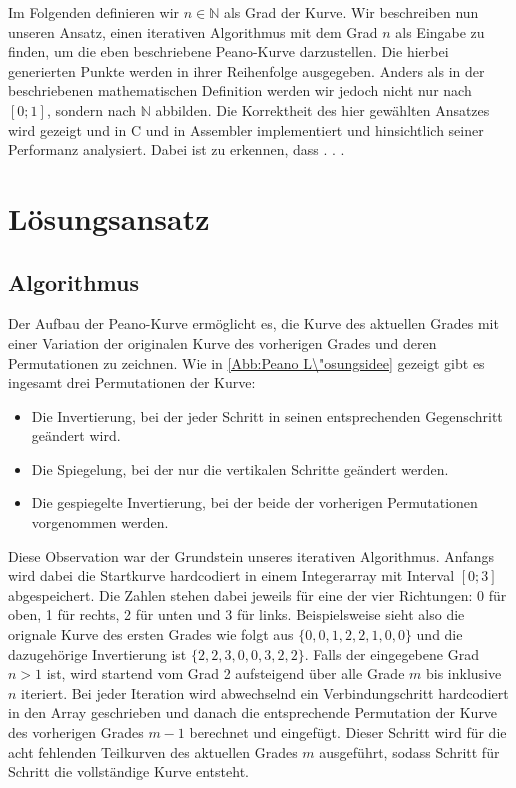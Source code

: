 \documentclass[course=asp]{aspdoc}
\begin{document}
Im Folgenden definieren wir $n \in \mathbb{N}$ als Grad der Kurve.
Wir beschreiben nun unseren Ansatz, einen iterativen Algorithmus mit dem Grad $n$ als Eingabe zu finden, um die eben beschriebene Peano-Kurve darzustellen. Die hierbei generierten Punkte werden in ihrer Reihenfolge ausgegeben. Anders als in der beschriebenen mathematischen Definition werden wir jedoch nicht nur nach $[0;1]$, sondern nach $\mathbb{N}$ abbilden.
Die Korrektheit des hier gew\"ahlten Ansatzes wird gezeigt und in C und in Assembler implementiert und hinsichtlich seiner Performanz analysiert. Dabei ist zu erkennen, dass . . .

\newpage

\section{L\"osungsansatz} \label{L\"osungsansatz}

\subsection{Algorithmus} \label{Algorithmus}

Der Aufbau der Peano-Kurve erm\"oglicht es, die Kurve des aktuellen Grades mit einer Variation der originalen Kurve des vorherigen Grades und deren Permutationen zu zeichnen. Wie in \ref{Abb:Peano L\"osungsidee} gezeigt gibt es ingesamt drei Permutationen der Kurve:

\begin{itemize}
    \item Die Invertierung, bei der jeder Schritt in seinen entsprechenden Gegenschritt ge\"andert wird.
    \item Die Spiegelung, bei der nur die vertikalen Schritte ge\"andert werden.
    \item Die gespiegelte Invertierung, bei der beide der vorherigen Permutationen vorgenommen werden.
\end{itemize}

Diese Observation war der Grundstein unseres iterativen Algorithmus. Anfangs wird dabei die Startkurve hardcodiert in einem Integerarray mit Interval $[0;3]$ abgespeichert. Die Zahlen stehen dabei jeweils f\"ur eine der vier Richtungen: 0 f\"ur oben, 1 f\"ur rechts, 2 f\"ur unten und 3 f\"ur links. Beispielsweise sieht also die orignale Kurve des ersten Grades wie folgt aus $\{0, 0, 1, 2, 2, 1, 0, 0\}$ und die dazugeh\"orige Invertierung ist $\{2, 2, 3, 0, 0, 3, 2, 2\}$. 
Falls der eingegebene Grad $n > 1$ ist, wird startend vom Grad 2 aufsteigend \"uber alle Grade $m$ bis inklusive $n$ iteriert. Bei jeder Iteration wird abwechselnd ein Verbindungschritt hardcodiert in den Array geschrieben und danach die entsprechende Permutation der Kurve des vorherigen Grades $m - 1$ berechnet und eingef\"ugt. Dieser Schritt wird f\"ur die acht fehlenden Teilkurven des aktuellen Grades $m$ ausgef\"uhrt, sodass Schritt f\"ur Schritt die vollst\"andige Kurve entsteht.
\end{document}
